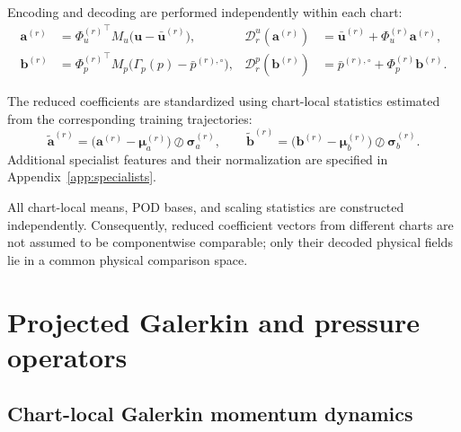 \documentclass{article}
\begin{document}
Encoding and decoding are performed independently within each chart:
\begin{align}
    \bm a^{(r)}
    &=
    {\Phi_u^{(r)}}^\top
    M_u
    \bigl(\bm u-\bar{\bm u}^{(r)}\bigr),
    &
    \mathcal D_r^u(\bm a^{(r)})
    &=
    \bar{\bm u}^{(r)}
    +\Phi_u^{(r)}\bm a^{(r)},
    \\
    \bm b^{(r)}
    &=
    {\Phi_p^{(r)}}^\top
    M_p
    \bigl(\Gamma_p(p)-\bar p^{(r),\circ}\bigr),
    &
    \mathcal D_r^p(\bm b^{(r)})
    &=
    \bar p^{(r),\circ}
    +\Phi_p^{(r)}\bm b^{(r)}.
    \label{eq:app_encode_decode}
\end{align}

The reduced coefficients are standardized using chart-local statistics
estimated from the corresponding training trajectories:
\begin{equation}
    \widetilde{\bm a}^{(r)}
    =
    \bigl(
        \bm a^{(r)}-\bm\mu_a^{(r)}
    \bigr)
    \oslash
    \bm\sigma_a^{(r)},
    \qquad
    \widetilde{\bm b}^{(r)}
    =
    \bigl(
        \bm b^{(r)}-\bm\mu_b^{(r)}
    \bigr)
    \oslash
    \bm\sigma_b^{(r)}.
    \label{eq:app_local_scalers}
\end{equation}
Additional specialist features and their normalization are specified in
Appendix~\ref{app:specialists}.

All chart-local means, POD bases, and scaling statistics are constructed
independently.
Consequently, reduced coefficient vectors from different charts are not
assumed to be componentwise comparable; only their decoded physical fields lie in a common physical comparison space.






\section{Projected Galerkin and pressure operators}
\label{app:rom}

\subsection{Chart-local Galerkin momentum dynamics}
\end{document}
